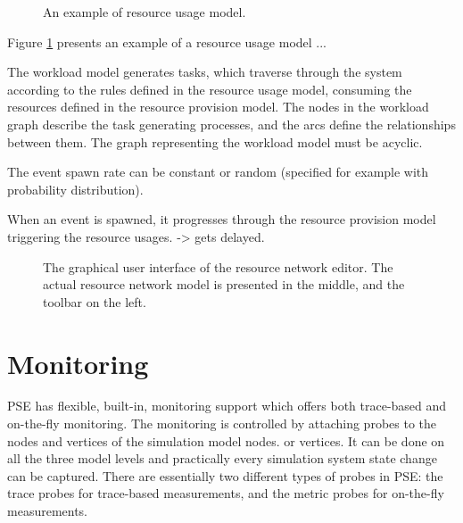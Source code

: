 \begin{figure}[h!]
  \begin{center}
    \caption{An example of resource usage model.}
    \label{fig:resource-usage-model}
  \end{center}
\end{figure}

Figure \ref{fig:resource-usage-model} presents an example of a resource usage model ...

The workload model generates tasks, which traverse through the system according to the rules defined in the resource usage model, consuming the resources defined in the resource provision model. The nodes in the workload graph describe the task generating processes, and the arcs define the relationships between them. The graph representing the workload model must be acyclic.

The event spawn rate can be constant or random (specified for example with probability distribution).

When an event is spawned, it progresses through the resource provision model triggering the resource usages. -> gets delayed.

\begin{figure}[h]
  \begin{center}
    \caption{The graphical user interface of the resource network editor. The actual resource network model is presented in the middle, and the toolbar on the left.}
    \label{fig:rne-example}
  \end{center}
\end{figure}

\section{Monitoring}

PSE has flexible, built-in, monitoring support which offers both trace-based and on-the-fly monitoring. The monitoring is controlled by attaching probes to the nodes and vertices of the simulation model nodes. or vertices. It can be done on all the three model levels and practically every simulation system state change can be captured. There are essentially two different types of probes in PSE: the trace probes for trace-based measurements, and the metric probes for on-the-fly measurements.

